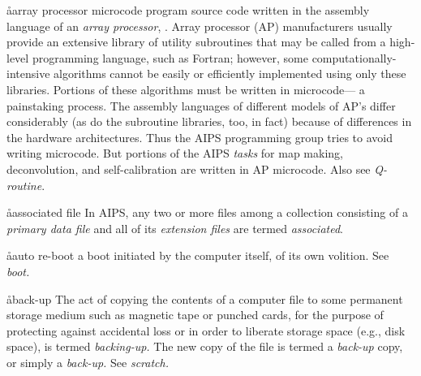 \aa{array processor microcode}
program source code written in the assembly language of an
{\it array processor}, \qv.
Array processor (AP) manufacturers usually provide an extensive
library of utility subroutines that may be called from a high-level
programming language, such as Fortran;
however, some computationally-intensive algorithms cannot be
easily or efficiently implemented using only these libraries.
Portions of these algorithms must be written in microcode---%
a painstaking process.
The assembly languages of different models of AP's differ considerably
(as do the subroutine libraries, too, in fact)
because of differences in the hardware architectures.
Thus the AIPS programming group tries to avoid writing microcode.
But portions of the AIPS {\it tasks} for map making, deconvolution,
and self-calibration are written in AP microcode.
Also see {\it Q-routine}.

\aa{associated file}
In AIPS, any two or more files among a collection
consisting of a {\it primary data file} and all of
its {\it extension files} are termed {\it associated}.

\aa{auto re-boot}
a boot initiated by the computer itself, of its own volition.
See {\it boot.}

\aa{back-up}
The act of copying the contents of a computer file
to some permanent storage medium such as magnetic tape or punched cards,
for the purpose of protecting against accidental loss
or in order to liberate storage space (e.g., disk space),
is termed {\it backing-up.}
The new copy of the file is termed a {\it back-up} copy,
or simply a {\it back-up.}
See {\it scratch.}

